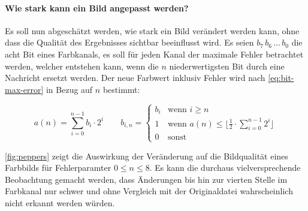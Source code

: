 \paragraph{Wie stark kann ein Bild angepasst werden?}
Es soll nun abgeschätzt werden, wie stark ein Bild verändert
werden kann, ohne dass die Qualität des Ergebnisses sichtbar beeinflusst
wird. Es seien $b_7\,b_6\, \ldots \,b_0$ die acht Bit eines Farbkanals, es soll für
jeden Kanal der maximale Fehler betrachtet werden, welcher entstehen kann,
wenn die $n$ niederwertigsten Bit durch eine Nachricht ersetzt werden.
Der neue Farbwert inklusiv Fehler wird nach \eqref{eq:bit-max-error} in Bezug auf $n$ bestimmt:

\begin{equation}
  a(n) = \sum_{i=0}^{n - 1} b_i \cdot 2^i \qquad
  b_{i, n} =
  \begin{cases}
    b_i & \text{wenn $i \geq n$}                                                           \\
    1   & \text{wenn $a(n) \leq \lfloor \frac{1}{2} \cdot \sum_{i=0}^{n - 1} 2^i$} \rfloor \\
    0   & \text{sonst}
  \end{cases}
  \label{eq:bit-max-error}
\end{equation}

\noindent
\autoref{fig:peppers} zeigt die Auswirkung der Veränderung auf die Bildqualität
eines Farbbilds für Fehlerparamter $0 \leq n \leq 8$.
Es kann die durchaus vielversprechende Beobachtung
gemacht werden, dass Änderungen bis hin zur vierten Stelle im Farbkanal nur schwer und
ohne Vergleich mit der Originaldatei wahrscheinlich nicht erkannt werden würden.

